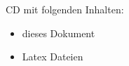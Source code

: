 	

\cleardoublepage 
{}
CD mit folgenden Inhalten:
\begin{itemize}
	\item dieses Dokument
	\item Latex Dateien
\end{itemize}